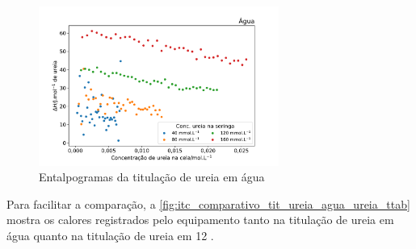 
\begin{figure}[h]
	\centering
	\includegraphics[width=0.7\textwidth]{imagens/itc/interacao_branco}
	\caption{Entalpogramas da titulação de ureia em água}
	\label{fig:itc_interacaoUrAgua}
\end{figure}
	
	 Para facilitar a comparação, a \autoref{fig:itc_comparativo_tit_ureia_agua_ureia_ttab} mostra os calores registrados pelo equipamento tanto na titulação de ureia em água quanto na titulação de ureia em \TTAB{} 12 \mM. 
	 
